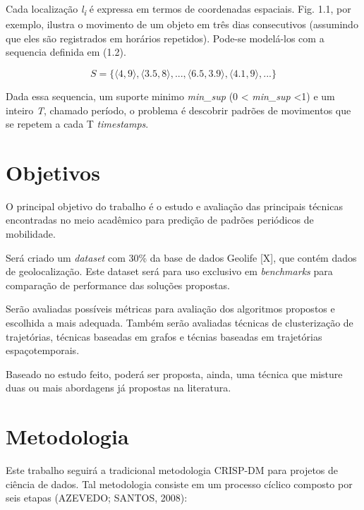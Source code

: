 \documentclass[ppgc,pep]{iiufrgs}
\begin{document}
Cada localização {\it l\textsubscript{i}} é expressa em termos de coordenadas espaciais. 
 Fig. 1.1, por exemplo, ilustra
o movimento de um objeto em três dias consecutivos
(assumindo que eles são registrados em horários repetidos). 
Pode-se modelá-los com a sequencia definida em (1.2). 

\begin{equation}
S = \{ \langle 4, 9 \rangle, \langle 3.5, 8 \rangle, ..., \langle 6.5, 3.9 \rangle, \langle 4.1, 9 \rangle, ... \}
\end{equation}


Dada essa sequencia, um suporte minimo {\it min\_sup} (0 < {\it min\_sup} <1) e um inteiro {\it T}, chamado
período, o problema é descobrir padrões de movimentos que se repetem
a cada T {\it timestamps}. 



\chapter{Objetivos}

O principal objetivo do trabalho é o estudo e avaliação das principais
técnicas encontradas no meio acadêmico para predição de padrões periódicos
de mobilidade.

Será criado um {\it dataset} com 30\% da base de dados Geolife [X],
que contém dados de geolocalização. Este dataset será para uso exclusivo
em {\it benchmarks} para comparação de performance das soluções propostas.

Serão avaliadas possíveis métricas para avaliação dos algoritmos propostos 
e escolhida a mais adequada. Também serão avaliadas técnicas de clusterização 
de trajetórias, técnicas baseadas em grafos e técnias baseadas em trajetórias 
espaçotemporais. 

Baseado no estudo feito, poderá ser proposta, ainda, uma técnica que misture duas ou
mais abordagens já propostas na literatura.



\chapter{Metodologia}

Este trabalho seguirá a tradicional metodologia CRISP-DM para projetos de ciência de dados. Tal metodologia consiste em um processo cíclico composto por seis etapas (AZEVEDO; SANTOS, 2008):
\end{document}
